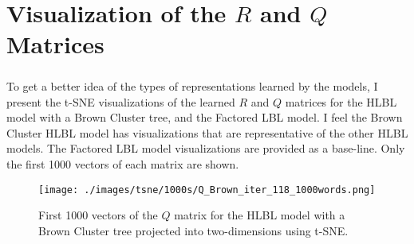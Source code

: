 
\chapter{Visualization of the $R$ and $Q$ Matrices}
\paragraph{}
To get a better idea of the types of representations learned by the models, I present the t-SNE visualizations of the learned $R$ and $Q$ matrices for the HLBL model with a Brown Cluster tree, and the Factored LBL model. I feel the Brown Cluster HLBL model has visualizations that are representative of the other HLBL models. The Factored LBL model visualizations are provided as a base-line. Only the first 1000 vectors of each matrix are shown.



\begin{figure}[ht]
\texttt{[image: ./images/tsne/1000s/Q\_Brown\_iter\_118\_1000words.png]} 
\centering
\caption{First 1000 vectors of the $Q$ matrix for the HLBL model with a Brown Cluster tree projected into two-dimensions using t-SNE.}
\end{figure}
%
%
%
%

